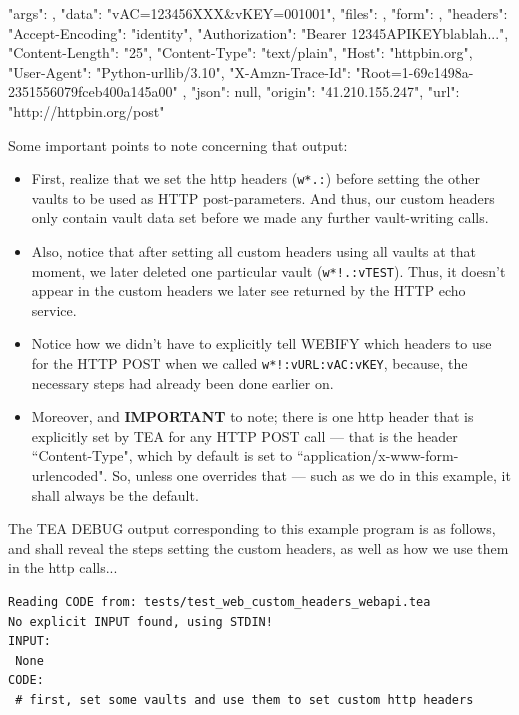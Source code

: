 \documentclass[a4paper, 18pt]{book} %
\begin{document}
{{{ \vspace{2em}
 \begin{tcbverbatim}[title=Sample OUTPUT 5 from EXAMPLE 5]
{
  "args": {},
  "data": "vAC=123456XXX&vKEY=001001",
  "files": {},
  "form": {},
  "headers": {
    "Accept-Encoding": "identity",
    "Authorization": "Bearer 12345APIKEYblablah...",
    "Content-Length": "25",
    "Content-Type": "text/plain",
    "Host": "httpbin.org",
    "User-Agent": "Python-urllib/3.10",
    "X-Amzn-Trace-Id": "Root=1-69c1498a-2351556079fceb400a145a00"
  },
  "json": null,
  "origin": "41.210.155.247",
  "url": "http://httpbin.org/post"
}
  \end{tcbverbatim}
 \vspace{2em} 

  
Some important points to note concerning that output:

\begin{itemize}
\item First, realize that we set the http headers (\texttt{w*.:}) before setting the other vaults to be used as HTTP post-parameters. And thus, our custom headers only contain vault data set before we made any further vault-writing calls.
\item Also, notice that after setting all custom headers using all vaults at that moment, we later deleted one particular vault (\texttt{w*!.:vTEST}). Thus, it doesn't appear in the custom headers we later see returned by the HTTP echo service.
\item Notice how we didn't have to explicitly tell WEBIFY which headers to use for the HTTP POST when we called \texttt{w*!:vURL:vAC:vKEY}, because, the necessary steps had already been done earlier on.
\item Moreover, and \textbf{IMPORTANT} to note; there is one http header that is explicitly set by TEA for any HTTP POST call --- that is the header ``Content-Type", which by default is set to ``application/x-www-form-urlencoded". So, unless one overrides that --- such as we do in this example, it shall always be the default.
\end{itemize}

The TEA DEBUG output corresponding to this example program is as follows, and shall reveal the steps setting the custom headers, as well as how we use them in the http calls...



\vspace{2em}
  \begin{tcolorbox}[myterminalstyle, title=DEBUGGING a TEA custom HTTP HEADERS with HTTP POST scenario, breakable]
  \begin{lstlisting}[breaklines=true]
Reading CODE from: tests/test_web_custom_headers_webapi.tea
No explicit INPUT found, using STDIN!
INPUT:
 None
CODE:
 # first, set some vaults and use them to set custom http headers


\end{lstlisting}
\end{tcolorbox}}}}
\end{document}
